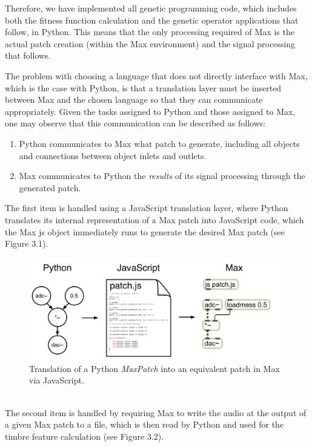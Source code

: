 \documentclass[a4paper,12pt]{report} 	%
\numberwithin{figure}{chapter}
\numberwithin{table}{chapter}
\numberwithin{equation}{chapter}
\begin{document}
\begin{flushleft}
Therefore, we have implemented all genetic programming code, which includes both the fitness function calculation and the genetic operator applications that follow, in Python. This means that the only processing required of Max is the actual patch creation (within the Max environment) and the signal processing that follows.

The problem with choosing a language that does not directly interface with Max, which is the case with Python, is that a translation layer must be inserted between Max and the chosen language so that they can communicate appropriately. Given the tasks assigned to Python and those assigned to Max, one may observe that this communication can be described as follows:
\begin{enumerate}
\item Python communicates to Max what patch to generate, including all objects and connections between object inlets and outlets. 
\item Max communicates to Python the \emph{results} of its signal processing through the generated patch.
\end{enumerate}
The first item is handled using a JavaScript translation layer, where Python translates its internal representation of a Max patch into JavaScript code, which the Max js object immediately runs to generate the desired Max patch (see Figure 3.1). 
\begin{figure}[h!]
\begin{center}
\includegraphics[scale=0.4]{JSTranslation}
\caption[Generating a Max patch given a parse-tree]{Translation of a Python \emph{MaxPatch} into an equivalent patch in Max via JavaScript.}
\end{center}
\end{figure}
\\
The second item is handled by requiring Max to write the audio at the output of a given Max patch to a file, which is then read  by Python and used for the timbre feature calculation (see Figure 3.2).
\begin{figure}[h!]

\end{figure}
\end{flushleft}
\end{document}
